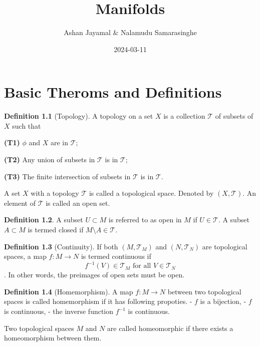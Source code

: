 \documentclass[
]{book}
\title{Manifolds}
\author{Ashan Jayamal \& Nalamudu Samarasinghe}
\date{2024-03-11}
\theoremstyle{definition}
\newtheorem{definition}{Definition}[chapter]
\theoremstyle{definition}
\theoremstyle{definition}
\theoremstyle{definition}
\theoremstyle{remark}
\begin{document}
\maketitle

{
\setcounter{tocdepth}{1}
\tableofcontents
}
\hypertarget{basic-theroms-and-definitions}{%
\chapter{Basic Theroms and Definitions}\label{basic-theroms-and-definitions}}

\begin{definition}[Topology]
\protect\hypertarget{def:Top}{}\label{def:Top}A topology on a set \(X\) is a collection \(\mathcal{T}\) of subsets of \(X\) such that

\textbf{(T1)} \(\phi\) and \(X\) are in \(\mathcal{T}\);

\textbf{(T2)} Any union of subsets in \(\mathcal{T}\) is in \(\mathcal{T}\);

\textbf{(T3)} The finite intersection of subsets in \(\mathcal{T}\) is in \(\mathcal{T}\).
\end{definition}

A set \(X\) with a topology \(\mathcal{T}\) is called a topological space. Denoted by \((X,\mathcal{T})\). An element of \(\mathcal{T}\) is called an open set.

\begin{definition}
\protect\hypertarget{def:unnamed-chunk-1}{}\label{def:unnamed-chunk-1}A subset \(U \subset M\) is referred to as open in \(M\) if \(U \in \mathcal{T}\). A subset \(A \subset M\) is termed closed if \(M \setminus A \in \mathcal{T}\).
\end{definition}

\begin{definition}[Continuity]
\protect\hypertarget{def:unnamed-chunk-2}{}\label{def:unnamed-chunk-2}If both \((M, \mathcal{T}_M)\) and \((N, \mathcal{T}_N)\) are topological spaces, a map \(f : M \rightarrow N\) is termed continuous if \[f^{-1}(V) \in \mathcal{T}_M \text{ for all } V \in \mathcal{T}_N\].
In other words, the preimages of open sets must be open.
\end{definition}

\begin{definition}[Homemorphism]
\protect\hypertarget{def:unnamed-chunk-3}{}\label{def:unnamed-chunk-3}A map \(f : M \rightarrow N\) between two topological spaces is called homemorphism if it has following propoties.
- \(f\) is a bijection,
- \(f\) is continuous,
- the inverse function \(f^{-1}\) is continuous.

Two topological spaces \(M\) and \(N\) are called homeomorphic if there exists a homeomorphism between them.
\end{definition}
\end{document}
